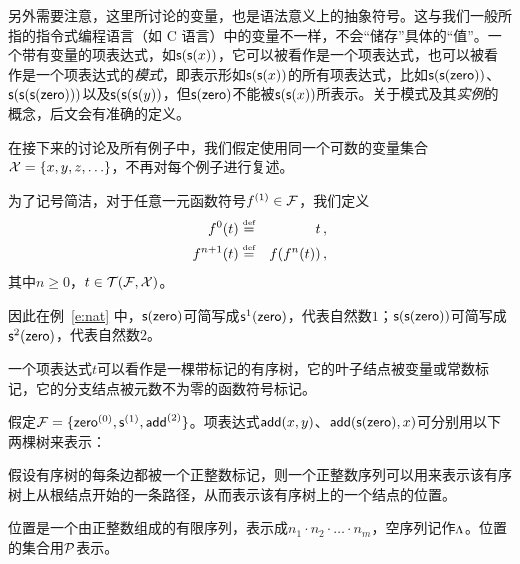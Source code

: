 另外需要注意，这里所讨论的变量，也是语法意义上的抽象符号。这与我们一般所指的指令式编程语言（如 C 语言）中的变量不一样，不会“储存”具体的“值”。一个带有变量的项表达式，如$\s(\s(x))$，它可以被看作是一个项表达式，也可以被看作是一个项表达式的\emph{模式}，即表示形如$\s(\s(x))$的所有项表达式，比如$\s(\s(\zero))$、$\s(\s(\s(\zero)))$以及$\s(\s(\s(y))$，但$\s(\zero)$不能被$\s(\s(x))$所表示。关于模式及其\emph{实例}的概念，后文会有准确的定义。

在接下来的讨论及所有例子中，我们假定使用同一个可数的变量集合$\cX=\{x,y,z,\ldots\}$，不再对每个例子进行复述。

为了记号简洁，对于任意一元函数符号$f^{(1)}\in\cF$，我们定义
\begin{eqnarray}
    f^0(t) & \defeq & t \, ,     \nonumber \\
    f^{n+1}(t) & \defeq & f(f^n(t)) \, ,\nonumber 
\end{eqnarray}
其中$n\ge 0$，$t\in\TFX$。

因此在例~\ref{e:nat} 中，$\s(\zero)$可简写成$\s^1(\zero)$，代表自然数$1$；$\s(\s(\zero))$可简写成$\s^2(\zero)$，代表自然数$2$。

一个项表达式$t$可以看作是一棵带标记的有序树，它的叶子结点被变量或常数标记，它的分支结点被元数不为零的函数符号标记。

\begin{example}
\label{e:term-tree}
假定$\cF = \{\zero^{(0)}, \s^{(1)}, \add^{(2)}\}$。项表达式$\add(x,y)$、$\add(\s(\zero), x)$可分别用以下两棵树来表示：

\medskip
\centering
{}
\end{example}

假设有序树的每条边都被一个正整数标记，则一个正整数序列可以用来表示该有序树上从根结点开始的一条路径，从而表示该有序树上的一个结点的位置。

\begin{definition}[位置]
位置是一个由正整数组成的有限序列，表示成$n_1\cdot n_2\cdot\ldots\cdot n_m$，空序列记作$\rootp$。位置的集合用$\cP$表示。
\end{definition}


